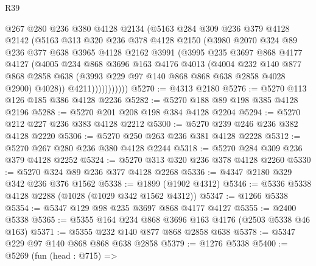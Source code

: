 \begin{lexlean}{R39}
\begin{coremodule}
                  @267
                  @280
                  @236
                  @380
                  @4128
                  @2134
                  (@5163
                    @284
                    @309
                    @236
                    @379
                    @4128
                    @2142
                    (@5163
                      @313
                      @320
                      @236
                      @378
                      @4128
                      @2150
                      (@3980
                        @2070
                        @324
                        @89
                        @236
                        @377
                        @638
                        @3965
                        @4128
                        @2162
                        @3991
                        (@3995
                          @235
                          @3697
                          @868
                          @4177
                          @4127
                          (@4005
                            @234
                            @868
                            @3696
                            @163
                            @4176
                            @4013
                            (@4004
                              @232
                              @140
                              @877
                              @868
                              @2858
                              @638
                              (@3993 @229 @97 @140 @868 @868 @638 @2858 @4028 @2900)
                              @4028))
                          @4211)))))))))))
@5270 := @4313 @2180
@5276 := @5270 @113 @126 @185 @386 @4128 @2236
@5282 := @5270 @188 @89 @198 @385 @4128 @2196
@5288 := @5270 @201 @208 @198 @384 @4128 @2204
@5294 := @5270 @212 @227 @236 @383 @4128 @2212
@5300 := @5270 @239 @246 @236 @382 @4128 @2220
@5306 := @5270 @250 @263 @236 @381 @4128 @2228
@5312 := @5270 @267 @280 @236 @380 @4128 @2244
@5318 := @5270 @284 @309 @236 @379 @4128 @2252
@5324 := @5270 @313 @320 @236 @378 @4128 @2260
@5330 := @5270 @324 @89 @236 @377 @4128 @2268
@5336 := @4347 @2180 @329 @342 @236 @376 @1562
@5338 := @1899 (@1902 @4312)
@5346 := @5336 @5338 @4128 @2288 (@1028 (@1029 @342 @1562 @4312))
@5347 := @1266 @5338
@5354 := @5347 @129 @98 @235 @3697 @868 @4177 @4127
@5355 := @2400 @5338
@5365 := @5355 @164 @234 @868 @3696 @163 @4176 (@2503 @5338 @46 @163)
@5371 := @5355 @232 @140 @877 @868 @2858 @638
@5378 := @5347 @229 @97 @140 @868 @868 @638 @2858
@5379 := @1276 @5338
@5400 := @5269
    (fun (head : @715) =>

\end{coremodule}
\end{lexlean}
